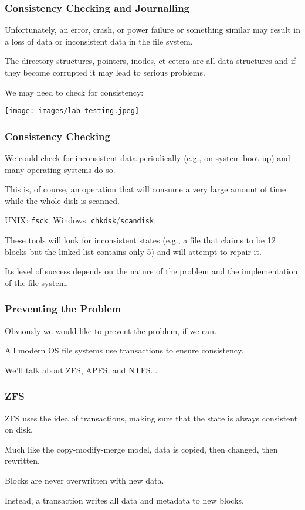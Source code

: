 \begin{frame}
	\frametitle{Consistency Checking and Journalling}

	Unfortunately, an error, crash, or power failure or something similar may result in a loss of data or inconsistent data in the file system.

	The directory structures, pointers, inodes, et cetera are all data structures and if they become corrupted it may lead to serious problems.

	We may need to check for consistency:

	\begin{center}
		\texttt{[image: images/lab-testing.jpeg]}
	\end{center}

\end{frame}

\begin{frame}
	\frametitle{Consistency Checking}

	We could check for inconsistent data periodically (e.g., on system boot up) and many operating systems do so.

	This is, of course, an operation that will consume a very large amount of time while the whole disk is scanned.

	UNIX: \texttt{fsck}. Windows: \texttt{chkdsk}/\texttt{scandisk}.

	These tools will look for inconsistent states (e.g., a file that claims to be 12 blocks but the linked list contains only 5) and will attempt to repair it.

	Its level of success depends on the nature of the problem and the implementation of the file system.

\end{frame}



\begin{frame}
	\frametitle{Preventing the Problem}

	Obviously we would like to prevent the problem, if we can.

	All modern OS file systems use transactions to ensure consistency.

	We'll talk about ZFS, APFS, and NTFS...

\end{frame}


\begin{frame}
	\frametitle{ZFS}

	ZFS uses the idea of transactions, making sure that the state is always consistent on disk.

	Much like the copy-modify-merge model, data is copied, then changed, then rewritten.

	Blocks are never overwritten with new data.

	Instead, a transaction writes all data and metadata to new blocks.

\end{frame}


